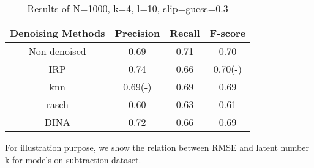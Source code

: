 \documentclass[11pt]{article}
\begin{document}
\begin{table}[!h]
\begin{center}
\begin{tabular}{|c|c|c|c|}
\hline
Denoising Methods & Precision & Recall & F-score\\
\hline
Non-denoised & 0.69 & 0.71 & 0.70  \\
\hline
IRP & 0.74 & 0.66 & 0.70(-) \\
\hline
knn & 0.69(-) & 0.69 & 0.69 \\
\hline
rasch & 0.60 & 0.63 & 0.61 \\
\hline
DINA & 0.72 & 0.66 & 0.69 \\
\hline
\end{tabular}
\end{center}
\caption{Results of N=1000, k=4, l=10, slip=guess=0.3}\label{tab:results18}
\end{table}


For illustration purpose, we show the relation between RMSE and latent number k for models on subtraction dataset.
%
%
%
	


\end{document}
